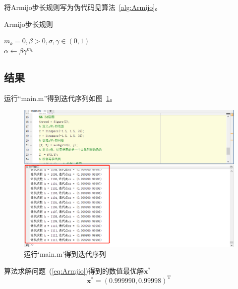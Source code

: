 将Armijo步长规则写为伪代码见算法~\ref{alg:Armijo}。

\begin{algorithm}[H]
    \SetAlgoLined
    \caption{Armijo步长规则}
    \label{alg:Armijo}
    $m_{k} = 0,\beta>0,\sigma,\gamma\in(0,1)$\\
    $\alpha \gets \beta\gamma^{m_{k}}$\\
    \Return{$\alpha$}
\end{algorithm}
\subsection{结果}
运行``main.m''得到迭代序列如图~\ref{fig:Armijo-matlab}。
\begin{figure}[htbp]
    \centering
    \includegraphics[width = .8\textwidth]{image/armijo.png}
    \caption{运行`main.m'得到迭代序列}
    \label{fig:Armijo-matlab}
\end{figure}

算法求解问题~(\ref{eq:Armjio})得到的数值最优解$\boldsymbol{x}^*$
\[
    \boldsymbol{x}^* = \left( 0.999990,0.99998 \right)^{\mathrm{T}}
\]

